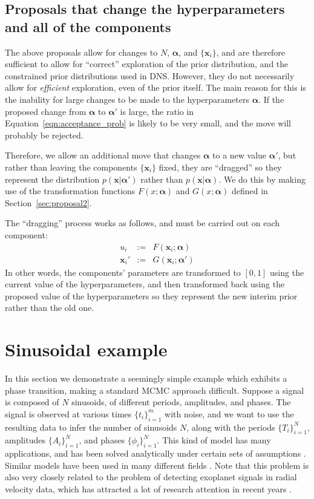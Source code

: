 \documentclass[letterpaper, 11pt]{article}
\newcommand{\hyperparams}{\boldsymbol{\alpha}}
\newcommand{\xx}{\mathbf{x}}
\begin{document}
\subsection{Proposals that change the hyperparameters
and all of the components}\label{sec:proposal4}
The above proposals allow for changes to $N$, $\hyperparams$, and $\{\xx_i\}$,
and are therefore sufficient to allow for ``correct'' exploration of the
prior distribution, and the constrained prior distributions used in DNS.
However, they do not necessarily allow for {\it efficient} exploration, even
of the prior itself. The main reason for this is the inability for large
changes to be made to the hyperparameters $\hyperparams$. If the proposed change
from $\hyperparams$ to $\hyperparams'$ is large, the ratio in
Equation~\ref{eqn:acceptance_prob} is likely to be very small, and the move
will probably be rejected.

Therefore, we allow an additional move that changes $\hyperparams$ to a new
value $\hyperparams'$, but rather than leaving the components $\{\xx_i\}$ fixed,
they are ``dragged''
so they represent the distribution $p(\xx | \hyperparams')$ rather than
$p(\xx|\hyperparams)$. We do this by making use of the transformation functions
$F(x; \hyperparams)$ and $G(x; \hyperparams)$ defined in
Section~\ref{sec:proposal2}.

The ``dragging'' process works as follows, and must be carried out on
each component:
\begin{eqnarray}
u_i &:=& F(\xx_i; \hyperparams)\\
\xx_i' &:=& G(\xx_i; \hyperparams')
\end{eqnarray}
In other words, the components' parameters are transformed to $[0,1]$ using the
current value of the hyperparameters, and then transformed back using the
proposed value of the hyperparameters so they represent the new interim prior
rather than the old one.

\section{Sinusoidal example}\label{sec:sinewaves}
In this section we demonstrate a seemingly simple example which exhibits
a phase transition, making a standard MCMC approach difficult. Suppose
a signal is composed of $N$ sinusoids, of different periods, amplitudes,
and phases. The signal is observed at various times $\{t_i\}_{i=1}^m$ with
noise, and we want to use the resulting data to infer the number of sinusoids
$N$, along with the periods $\{T_i\}_{i=1}^N$, amplitudes $\{A_i\}_{i=1}^N$,
and phases $\{\phi_i\}_{i=1}^N$.
This kind of model has many applications, and has been solved analytically
under certain sets of assumptions \citep[see e.g.][]{bretthorst, 2014arXiv1412.0467M}.
Similar
models have been used in many different fields
\citep[e.g.][]{2003AIPC..659....3B, 2005PhRvD..72b2001U, 2007ApJ...654..551B,
2009MNRAS.395.2226B}.
Note that this problem is also very closely related to the
problem of detecting exoplanet signals in radial velocity data, which has
attracted a lot of research attention in recent years
\citep[e.g.][]{gregory, fengji, 2011MNRAS.415.3462F}.
\end{document}
